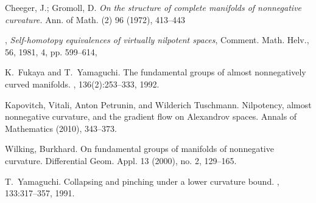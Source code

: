 \documentclass{amsart}
\begin{document}
\begin{thebibliography}{HMR75}

Cheeger, J.; Gromoll, D.
 \textit{On the structure of complete manifolds of nonnegative curvature.}
Ann. of Math. (2) 96 (1972), 413--443

,
 \textit{Self-homotopy equivalences of virtually nilpotent spaces},
{Comment. Math. Helv.},
{56},
{1981},
{4},
pp. {599--614},

K.~Fukaya and T.~Yamaguchi.
\newblock The fundamental groups of almost nonnegatively curved manifolds.
, 136(2):253--333, 1992.


 Kapovitch, Vitali, Anton Petrunin, and Wilderich Tuschmann. 
\newblock Nilpotency, almost nonnegative curvature, and the gradient flow on Alexandrov spaces. 
\newblock Annals of Mathematics (2010), 343--373.

Wilking, Burkhard. \newblock On fundamental groups of manifolds of nonnegative curvature. \newblock  Differential Geom. Appl.  13  (2000),  no. 2, 129--165.

T.~Yamaguchi.
\newblock Collapsing and pinching under a lower curvature bound.
, 133:317--357, 1991.
\end{thebibliography}
\end{document}
